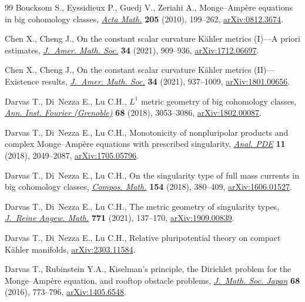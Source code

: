 \documentclass[pdftex]{sigma}
\numberwithin{equation}{section}
\theoremstyle{plain}
\begin{document}
\begin{thebibliography}{99}
Boucksom S., Eyssidieux P., Guedj V., Zeriahi A., Monge--{A}mp\`ere equations
 in big cohomology classes, \href{https://doi.org/10.1007/s11511-010-0054-7}{\textit{Acta Math.}} \textbf{205} (2010), 199--262,
 \href{https://arxiv.org/abs/0812.3674}{arXiv:0812.3674}.

Chen X., Cheng J., On the constant scalar curvature {K}\"ahler metrics
 ({I})---{A} priori estimates, \href{https://doi.org/10.1090/jams/967}{\textit{J.~Amer. Math. Soc.}} \textbf{34}
 (2021), 909--936, \href{https://arxiv.org/abs/1712.06697}{arXiv:1712.06697}.

Chen X., Cheng J., On the constant scalar curvature {K}\"ahler metrics
 ({II})---{E}xistence results, \href{https://doi.org/10.1090/jams/966}{\textit{J.~Amer. Math. Soc.}} \textbf{34}
 (2021), 937--1009, \href{https://arxiv.org/abs/1801.00656}{arXiv:1801.00656}.

Darvas T., Di~Nezza E., Lu C.H., {$L^1$} metric geometry of big cohomology
 classes, \href{https://doi.org/10.5802/aif.3236}{\textit{Ann. Inst. Fourier (Grenoble)}} \textbf{68} (2018),
 3053--3086, \href{https://arxiv.org/abs/1802.00087}{arXiv:1802.00087}.

Darvas T., Di~Nezza E., Lu C.H., Monotonicity of nonpluripolar products and
 complex {M}onge--{A}mp\`ere equations with prescribed singularity,
 \href{https://doi.org/10.2140/apde.2018.11.2049}{\textit{Anal. PDE}} \textbf{11} (2018), 2049--2087, \href{https://arxiv.org/abs/1705.05796}{arXiv:1705.05796}.

Darvas T., Di~Nezza E., Lu C.H., On the singularity type of full mass currents
 in big cohomology classes, \href{https://doi.org/10.1112/S0010437X1700759X}{\textit{Compos. Math.}} \textbf{154} (2018),
 380--409, \href{https://arxiv.org/abs/1606.01527}{arXiv:1606.01527}.

Darvas T., Di~Nezza E., Lu C.H., The metric geometry of singularity types,
 \href{https://doi.org/10.1515/crelle-2020-0019}{\textit{J.~Reine Angew. Math.}} \textbf{771} (2021), 137--170,
 \href{https://arxiv.org/abs/1909.00839}{arXiv:1909.00839}.

Darvas T., Di~Nezza E., Lu C.H., Relative pluripotential theory on compact
 {K}\"ahler manifolds, \href{https://arxiv.org/abs/2303.11584}{arXiv:2303.11584}.

Darvas T., Rubinstein Y.A., Kiselman's principle, the {D}irichlet problem for
 the {M}onge--{A}mp\`ere equation, and rooftop obstacle problems,
 \href{https://doi.org/10.2969/jmsj/06820773}{\textit{J.~Math. Soc. Japan}} \textbf{68} (2016), 773--796,
 \href{https://arxiv.org/abs/1405.6548}{arXiv:1405.6548}.


\end{thebibliography}
\end{document}

